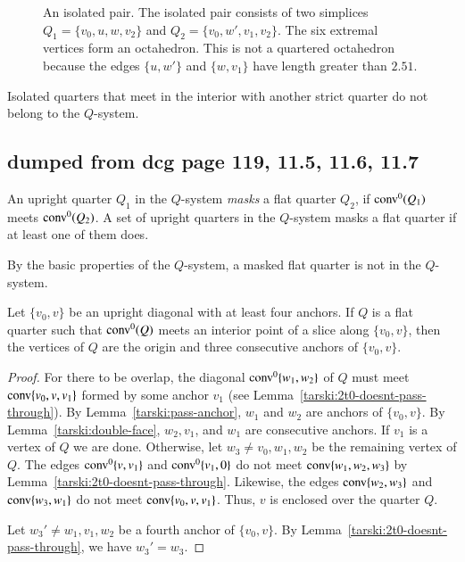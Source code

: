 \begin{figure}[htb]
  \centering
  \caption{An isolated pair.  The isolated pair consists of two simplices
   $Q_1=\{v_0,u,w,v_2\}$ and $Q_2=\{v_0,w',v_1,v_2\}$.  The six extremal vertices
   form an octahedron. This is not a quartered octahedron because the edges
   $\{u,w'\}$ and $\{w,v_1\}$ have length greater than $2.51$.}
\end{figure}


Isolated quarters that meet in the interior with another strict
quarter do not belong to the $Q$-system.



\newpage

\subsection{dumped from dcg page 119, 11.5, 11.6, 11.7}



\begin{definition}[mask]
An upright quarter $Q_1$ in the $Q$-system
{\it masks} a flat quarter $Q_2$, if
${\operatorname{conv}}^0(Q_1)$ meets ${\operatorname{conv}}^0(Q_2)$.   A set of upright
quarters in the $Q$-system masks a flat quarter if at least 
one of them does.
\end{definition}

By the basic properties of the $Q$-system, a masked flat quarter is
not in the $Q$-system.

\begin{lemma}
Let $\{v_0,v\}$ be an upright diagonal with at least four anchors.
If $Q$ is a flat quarter such that ${\operatorname{conv}}^0(Q)$  meets  
an interior point of 
a slice along $\{v_0,v\}$, then the vertices of $Q$ are the
origin and three consecutive anchors of $\{v_0,v\}$.
\end{lemma}

\begin{proof}
For there to be overlap, the diagonal ${\operatorname{conv}}^0\{w_1,w_2\}$ of $Q$ 
must meet
 ${\operatorname{conv}}\{v_0,v,v_1\}$ formed by some anchor $v_1$  (see
Lemma~\ref{tarski:2t0-doesnt-pass-through}).  By
Lemma~\ref{tarski:pass-anchor}, $w_1$ and $w_2$ are anchors of
$\{v_0,v\}$. By Lemma~\ref{tarski:double-face}, $w_2,v_1$, and $w_1$
are consecutive anchors. If $v_1$ is a vertex of $Q$ we are done.
Otherwise, let $w_3\ne v_0,w_1,w_2$ be the remaining vertex of $Q$.
The edges ${\operatorname{conv}}^0\{v,v_1\}$ and ${\operatorname{conv}}^0\{v_1,0\}$ do not
meet
${\operatorname{conv}}\{w_1,w_2,w_3\}$ by Lemma~\ref{tarski:2t0-doesnt-pass-through}.
Likewise, the edges ${\operatorname{conv}}\{w_2,w_3\}$ and ${\operatorname{conv}}\{w_3,w_1\}$ 
do not meet
 ${\operatorname{conv}}\{v_0,v,v_1\}$. Thus, $v$ is enclosed over the
quarter $Q$.

Let $w_3'\ne w_1,v_1,w_2$ be a fourth anchor of $\{v_0,v\}$. By
Lemma~\ref{tarski:2t0-doesnt-pass-through}, we have $w_3'=w_3$.
\end{proof}

